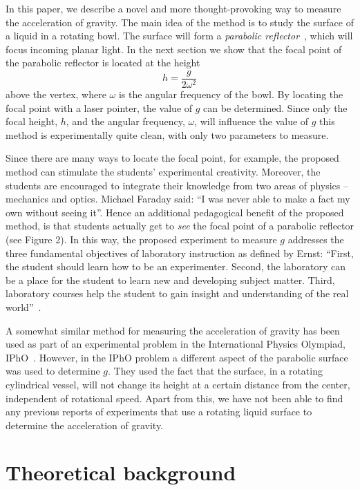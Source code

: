 \documentclass[11pt, a4paper, twocolumn, swedish, english]{article}
\begin{document}
In this paper, we describe a novel and more thought-provoking way to
measure the acceleration of gravity. The main idea of the method is to
study the surface of a liquid in a rotating bowl. The surface will
form a \emph{parabolic reflector}~\cite{Berg1990}, which will focus incoming planar
light. In the next section we show that the focal point of the parabolic reflector is located at the
height
\begin{equation}
h=\frac{g}{2\omega^2}
\end{equation}
above the vertex, where $\omega$ is the angular
frequency of the bowl. By locating the focal point with a laser pointer, the value of $g$ can be determined.
Since only the focal height, $h$, and the angular
frequency, $\omega$, will influence the value of $g$ this method
is experimentally quite clean, with only two parameters to measure. 

Since there are many ways to locate the focal point, for example, 
the proposed method can stimulate the students' experimental creativity.
Moreover, the students are encouraged to integrate their knowledge 
from two areas of physics -- mechanics and optics. Michael Faraday 
said: ``I was never able to make a fact my own without seeing it''.
Hence an additional pedagogical benefit of the proposed method, is that students
actually get to \emph{see} the focal point of a parabolic reflector (see Figure 2).
In this way, the proposed experiment to measure $g$ addresses the three fundamental objectives
of laboratory instruction as defined by Ernst:
``First, the student should learn how to be an experimenter.
Second, the laboratory can be a place for the student
to learn new and developing subject matter. Third, laboratory
courses help the student to gain insight and understanding of
the real world''~\cite{Ernst1983}.

A somewhat similar method for measuring the acceleration of gravity has been used as part of an experimental
problem in the International Physics Olympiad,
IPhO~\cite{IPhO2001}. However, in the IPhO problem a
different aspect of the parabolic surface was used
to determine $g$. They used the fact that the surface, in a rotating cylindrical vessel, will not change its height at a certain distance from the center, independent of rotational speed. Apart from this, we have not been able to find any previous reports of experiments that use a rotating liquid surface to
determine the acceleration of gravity.

\section{Theoretical background}
\end{document}
